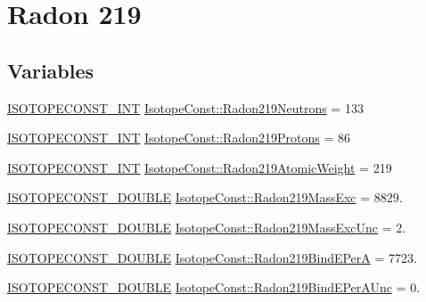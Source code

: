 \hypertarget{group___isotope_const-_radon-_rn219}{}\section{Radon 219}
\label{group___isotope_const-_radon-_rn219}
\subsection*{Variables}
\begin{DoxyCompactItemize}
\item 
\mbox{\hyperlink{group___isotope_const-_macros_ga5f18360b3e99483a35c32d789e62621c}{I\+S\+O\+T\+O\+P\+E\+C\+O\+N\+S\+T\+\_\+\+I\+NT}} \mbox{\hyperlink{group___isotope_const-_radon-_rn219_gab66bf49ab76f1f1e2b5cd6e517d03096}{Isotope\+Const\+::\+Radon219\+Neutrons}} = 133
\item 
\mbox{\hyperlink{group___isotope_const-_macros_ga5f18360b3e99483a35c32d789e62621c}{I\+S\+O\+T\+O\+P\+E\+C\+O\+N\+S\+T\+\_\+\+I\+NT}} \mbox{\hyperlink{group___isotope_const-_radon-_rn219_ga9a3c82347744cb9fa3aeba702ea80d8e}{Isotope\+Const\+::\+Radon219\+Protons}} = 86
\item 
\mbox{\hyperlink{group___isotope_const-_macros_ga5f18360b3e99483a35c32d789e62621c}{I\+S\+O\+T\+O\+P\+E\+C\+O\+N\+S\+T\+\_\+\+I\+NT}} \mbox{\hyperlink{group___isotope_const-_radon-_rn219_gabda3e1a1ac956a52a986f06741a76aa7}{Isotope\+Const\+::\+Radon219\+Atomic\+Weight}} = 219
\item 
\mbox{\hyperlink{group___isotope_const-_macros_ga8f45a7272ce02c0b4c65c44636ed719a}{I\+S\+O\+T\+O\+P\+E\+C\+O\+N\+S\+T\+\_\+\+D\+O\+U\+B\+LE}} \mbox{\hyperlink{group___isotope_const-_radon-_rn219_ga51fdf130e454a69f2fa58f3e4d3f9deb}{Isotope\+Const\+::\+Radon219\+Mass\+Exc}} = 8829.
\item 
\mbox{\hyperlink{group___isotope_const-_macros_ga8f45a7272ce02c0b4c65c44636ed719a}{I\+S\+O\+T\+O\+P\+E\+C\+O\+N\+S\+T\+\_\+\+D\+O\+U\+B\+LE}} \mbox{\hyperlink{group___isotope_const-_radon-_rn219_gad1ede90f85bfe8c03f4387fe2718cf56}{Isotope\+Const\+::\+Radon219\+Mass\+Exc\+Unc}} = 2.
\item 
\mbox{\hyperlink{group___isotope_const-_macros_ga8f45a7272ce02c0b4c65c44636ed719a}{I\+S\+O\+T\+O\+P\+E\+C\+O\+N\+S\+T\+\_\+\+D\+O\+U\+B\+LE}} \mbox{\hyperlink{group___isotope_const-_radon-_rn219_ga052a7483cf502648ca629947e16b6d7d}{Isotope\+Const\+::\+Radon219\+Bind\+E\+PerA}} = 7723.
\item 
\mbox{\hyperlink{group___isotope_const-_macros_ga8f45a7272ce02c0b4c65c44636ed719a}{I\+S\+O\+T\+O\+P\+E\+C\+O\+N\+S\+T\+\_\+\+D\+O\+U\+B\+LE}} \mbox{\hyperlink{group___isotope_const-_radon-_rn219_gaffab1c1f299939424f376a5e10973716}{Isotope\+Const\+::\+Radon219\+Bind\+E\+Per\+A\+Unc}} = 0.

\end{DoxyCompactItemize}
